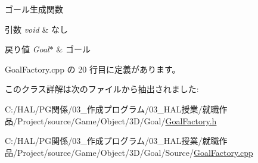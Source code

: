 ゴール生成関数 


\begin{DoxyParams}{引数}
{\em void} & なし \\
\hline
\end{DoxyParams}

\begin{DoxyRetVals}{戻り値}
{\em Goal$\ast$} & ゴール \\
\hline
\end{DoxyRetVals}


 Goal\+Factory.\+cpp の 20 行目に定義があります。



このクラス詳解は次のファイルから抽出されました\+:\begin{DoxyCompactItemize}
\item 
C\+:/\+H\+A\+L/\+P\+G関係/03\+\_\+作成プログラム/03\+\_\+\+H\+A\+L授業/就職作品/\+Project/source/\+Game/\+Object/3\+D/\+Goal/\mbox{\hyperlink{_goal_factory_8h}{Goal\+Factory.\+h}}\item 
C\+:/\+H\+A\+L/\+P\+G関係/03\+\_\+作成プログラム/03\+\_\+\+H\+A\+L授業/就職作品/\+Project/source/\+Game/\+Object/3\+D/\+Goal/\+Source/\mbox{\hyperlink{_goal_factory_8cpp}{Goal\+Factory.\+cpp}}\end{DoxyCompactItemize}
